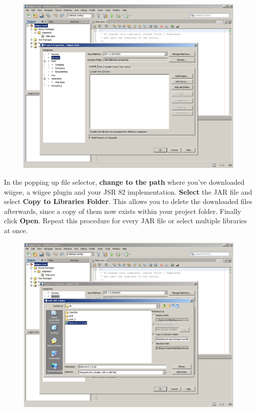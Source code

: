 \documentclass[%
   11pt,              %
   english,           %
   a4paper,           %
   DIV11,             %
   BCOR12mm,		  %
   titlepage,		  %
   bibtotoc,		  %
   liststotoc,		  %
   final,			  %
   twoside,			  %
   openright,		  %
   cleardoubleempty   %
]{scrreprt}%
\begin{document}
\begin{figure}[h]
\centering
\includegraphics[width=0.95\linewidth]{img/setup/netbeans/step3.png}
\end{figure}

In the popping up file selector, \textbf{change to the path} where you've downloaded wiigee, a wiigee plugin and your JSR 82 implementation. \textbf{Select} the JAR file and select \textbf{Copy to Libraries Folder}. This allows you to delete the downloaded files afterwards, since a copy of them now exists within your project folder. Finally click \textbf{Open}. Repeat this procedure for every JAR file or select multiple libraries at once.

\begin{figure}[h]
\centering
\includegraphics[width=0.95\linewidth]{img/setup/netbeans/step4.png}
\end{figure}
\end{document}
